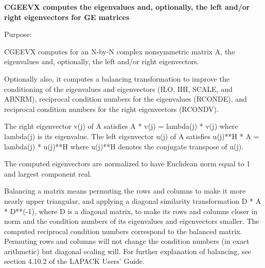 {\bfseries  C\+G\+E\+E\+V\+X computes the eigenvalues and, optionally, the left and/or right eigenvectors for G\+E matrices} 

 \begin{DoxyParagraph}{Purpose\+: }
\begin{DoxyVerb} CGEEVX computes for an N-by-N complex nonsymmetric matrix A, the
 eigenvalues and, optionally, the left and/or right eigenvectors.

 Optionally also, it computes a balancing transformation to improve
 the conditioning of the eigenvalues and eigenvectors (ILO, IHI,
 SCALE, and ABNRM), reciprocal condition numbers for the eigenvalues
 (RCONDE), and reciprocal condition numbers for the right
 eigenvectors (RCONDV).

 The right eigenvector v(j) of A satisfies
                  A * v(j) = lambda(j) * v(j)
 where lambda(j) is its eigenvalue.
 The left eigenvector u(j) of A satisfies
               u(j)**H * A = lambda(j) * u(j)**H
 where u(j)**H denotes the conjugate transpose of u(j).

 The computed eigenvectors are normalized to have Euclidean norm
 equal to 1 and largest component real.

 Balancing a matrix means permuting the rows and columns to make it
 more nearly upper triangular, and applying a diagonal similarity
 transformation D * A * D**(-1), where D is a diagonal matrix, to
 make its rows and columns closer in norm and the condition numbers
 of its eigenvalues and eigenvectors smaller.  The computed
 reciprocal condition numbers correspond to the balanced matrix.
 Permuting rows and columns will not change the condition numbers
 (in exact arithmetic) but diagonal scaling will.  For further
 explanation of balancing, see section 4.10.2 of the LAPACK
 Users' Guide.\end{DoxyVerb}
 
\end{DoxyParagraph}

